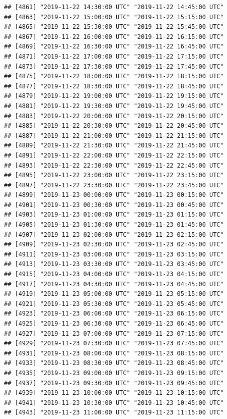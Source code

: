 \documentclass{article}\usepackage[]{graphicx}\usepackage[]{color}
\makeatletter
\newenvironment{kframe}{%
 \def\at@end@of@kframe{}%
 \ifinner\ifhmode%
  \def\at@end@of@kframe{\end{minipage}}%
  \begin{minipage}{\columnwidth}%
 \fi\fi%
 \def\FrameCommand##1{\hskip\@totalleftmargin \hskip-\fboxsep
 \colorbox{shadecolor}{##1}\hskip-\fboxsep
     \hskip-\linewidth \hskip-\@totalleftmargin \hskip\columnwidth}%
 \MakeFramed {\advance\hsize-\width
   \@totalleftmargin\z@ \linewidth\hsize
   \@setminipage}}%
 {\par\unskip\endMakeFramed%
 \at@end@of@kframe}
\newenvironment{knitrout}{}{} %
\makeatother
\begin{document}
\begin{knitrout}
\begin{kframe}
\begin{verbatim}
## [4861] "2019-11-22 14:30:00 UTC" "2019-11-22 14:45:00 UTC"
## [4863] "2019-11-22 15:00:00 UTC" "2019-11-22 15:15:00 UTC"
## [4865] "2019-11-22 15:30:00 UTC" "2019-11-22 15:45:00 UTC"
## [4867] "2019-11-22 16:00:00 UTC" "2019-11-22 16:15:00 UTC"
## [4869] "2019-11-22 16:30:00 UTC" "2019-11-22 16:45:00 UTC"
## [4871] "2019-11-22 17:00:00 UTC" "2019-11-22 17:15:00 UTC"
## [4873] "2019-11-22 17:30:00 UTC" "2019-11-22 17:45:00 UTC"
## [4875] "2019-11-22 18:00:00 UTC" "2019-11-22 18:15:00 UTC"
## [4877] "2019-11-22 18:30:00 UTC" "2019-11-22 18:45:00 UTC"
## [4879] "2019-11-22 19:00:00 UTC" "2019-11-22 19:15:00 UTC"
## [4881] "2019-11-22 19:30:00 UTC" "2019-11-22 19:45:00 UTC"
## [4883] "2019-11-22 20:00:00 UTC" "2019-11-22 20:15:00 UTC"
## [4885] "2019-11-22 20:30:00 UTC" "2019-11-22 20:45:00 UTC"
## [4887] "2019-11-22 21:00:00 UTC" "2019-11-22 21:15:00 UTC"
## [4889] "2019-11-22 21:30:00 UTC" "2019-11-22 21:45:00 UTC"
## [4891] "2019-11-22 22:00:00 UTC" "2019-11-22 22:15:00 UTC"
## [4893] "2019-11-22 22:30:00 UTC" "2019-11-22 22:45:00 UTC"
## [4895] "2019-11-22 23:00:00 UTC" "2019-11-22 23:15:00 UTC"
## [4897] "2019-11-22 23:30:00 UTC" "2019-11-22 23:45:00 UTC"
## [4899] "2019-11-23 00:00:00 UTC" "2019-11-23 00:15:00 UTC"
## [4901] "2019-11-23 00:30:00 UTC" "2019-11-23 00:45:00 UTC"
## [4903] "2019-11-23 01:00:00 UTC" "2019-11-23 01:15:00 UTC"
## [4905] "2019-11-23 01:30:00 UTC" "2019-11-23 01:45:00 UTC"
## [4907] "2019-11-23 02:00:00 UTC" "2019-11-23 02:15:00 UTC"
## [4909] "2019-11-23 02:30:00 UTC" "2019-11-23 02:45:00 UTC"
## [4911] "2019-11-23 03:00:00 UTC" "2019-11-23 03:15:00 UTC"
## [4913] "2019-11-23 03:30:00 UTC" "2019-11-23 03:45:00 UTC"
## [4915] "2019-11-23 04:00:00 UTC" "2019-11-23 04:15:00 UTC"
## [4917] "2019-11-23 04:30:00 UTC" "2019-11-23 04:45:00 UTC"
## [4919] "2019-11-23 05:00:00 UTC" "2019-11-23 05:15:00 UTC"
## [4921] "2019-11-23 05:30:00 UTC" "2019-11-23 05:45:00 UTC"
## [4923] "2019-11-23 06:00:00 UTC" "2019-11-23 06:15:00 UTC"
## [4925] "2019-11-23 06:30:00 UTC" "2019-11-23 06:45:00 UTC"
## [4927] "2019-11-23 07:00:00 UTC" "2019-11-23 07:15:00 UTC"
## [4929] "2019-11-23 07:30:00 UTC" "2019-11-23 07:45:00 UTC"
## [4931] "2019-11-23 08:00:00 UTC" "2019-11-23 08:15:00 UTC"
## [4933] "2019-11-23 08:30:00 UTC" "2019-11-23 08:45:00 UTC"
## [4935] "2019-11-23 09:00:00 UTC" "2019-11-23 09:15:00 UTC"
## [4937] "2019-11-23 09:30:00 UTC" "2019-11-23 09:45:00 UTC"
## [4939] "2019-11-23 10:00:00 UTC" "2019-11-23 10:15:00 UTC"
## [4941] "2019-11-23 10:30:00 UTC" "2019-11-23 10:45:00 UTC"
## [4943] "2019-11-23 11:00:00 UTC" "2019-11-23 11:15:00 UTC"

\end{verbatim}
\end{kframe}
\end{knitrout}
\end{document}
